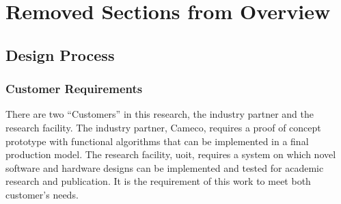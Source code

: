\chapter{Removed Sections from Overview}
\label{chap:removed}
\section{Design Process}
\label{sec:design}
\subsection{Customer Requirements}
There are two ``Customers'' in this research, the industry partner and the research facility. The industry partner, Cameco, requires a proof of concept prototype with functional algorithms that can be implemented in a final production model. The research facility, \acrshort{uoit}, requires a system on which novel software and hardware designs can be implemented and tested for academic research and publication. It is the requirement of this work to meet both customer's needs.\\

